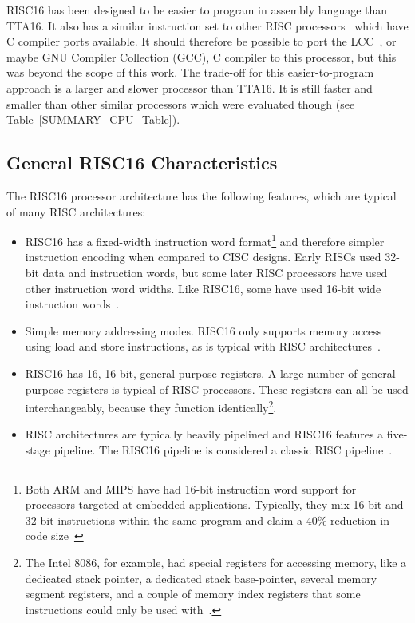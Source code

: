 RISC16 has been designed to be easier to program in assembly language than TTA16.
It also has a similar instruction set to other RISC processors~\cite{FPGACPU,
SuperH} which have C compiler ports available. It should therefore be possible to
port the LCC~\cite{FPGACPU}, or maybe GNU Compiler
Collection (GCC), C
compiler to this processor, but this was beyond the scope of this work. The
trade-off for this easier-to-program approach is a larger and slower processor
than TTA16. It is still faster and smaller than other similar processors which
were evaluated though (see Table~\ref{SUMMARY_CPU_Table}).


\subsection{General RISC16 Characteristics}
The RISC16 processor architecture has the following features, which are typical
of many RISC architectures:
\begin{itemize}
  \item RISC16 has a fixed-width instruction word format\footnote{Both ARM and
  MIPS have had 16-bit instruction word support for processors targeted at embedded
  applications. Typically, they mix 16-bit and 32-bit instructions within
  the same program and claim a 40\% reduction in code size~\cite{Comp_Arch}}
  and therefore simpler instruction encoding when compared to CISC designs.
  Early RISCs used 32-bit data and instruction words, but some later RISC
  processors have used other instruction word widths. Like RISC16, some have
  used 16-bit wide instruction words~\cite{FPGACPU, SuperH, ARM_Cortex_M3}.
  \item Simple memory addressing modes. RISC16 only supports memory access
  using load and store instructions, as is typical with RISC
  architectures~\cite{Comp_Arch, Comp_Arch2}.
  \item RISC16 has 16, 16-bit, general-purpose registers. A large number of
  general-purpose registers is typical of RISC processors. These registers can
  all be used interchangeably, because they function identically\footnote{The
  Intel 8086, for example, had special registers for accessing memory, like a
  dedicated stack pointer, a dedicated stack base-pointer, several memory
  segment registers, and a couple of memory index registers that some
  instructions could only be used with~\cite{mcfarland2003md}.}.
  \item RISC architectures are typically heavily pipelined and RISC16
  features a five-stage pipeline. The RISC16 pipeline is considered a classic
  RISC pipeline~\cite{smith1994paa}.
\end{itemize}


